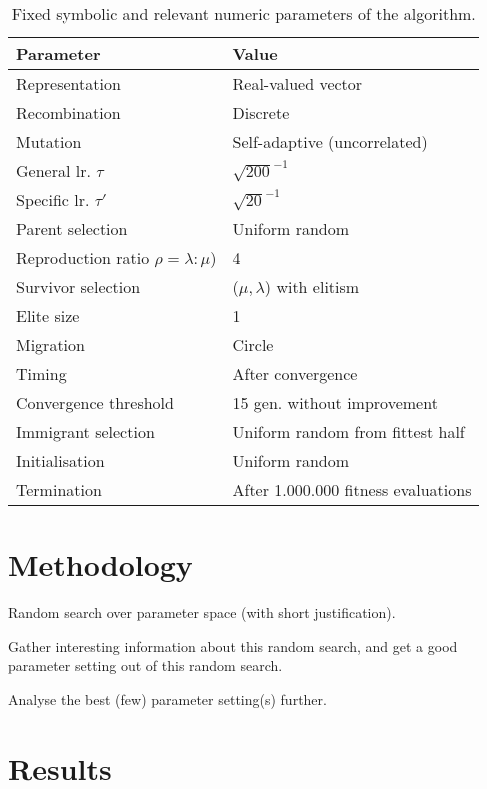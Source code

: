 \documentclass[letterpaper, 10 pt, conference]{ieeeconf}  %
\begin{document}
\begin{table}[h]
\caption{Fixed symbolic and relevant numeric parameters of the algorithm.}
\label{tab:params}
\centering
\begin{tabular}{>{\quad}ll}
\toprule
\textbf{Parameter} & \textbf{Value} \\
\midrule
Representation      & Real-valued vector \\
\midrule
Recombination       & Discrete \\
\midrule
Mutation            & Self-adaptive (uncorrelated) \\
\quad General lr. $\tau$ & $\sqrt{200}^{-1}$ \\
\quad Specific lr. $\tau'$ & $\sqrt{20}^{-1}$ \\
\midrule
Parent selection    & Uniform random \\
\quad Reproduction ratio $\rho=\lambda:\mu$) & 4 \\
\midrule
Survivor selection  & ($\mu,\lambda$) with elitism \\
\quad Elite size & 1 \\
\midrule
Migration           & Circle \\
\quad Timing        & After convergence \\
\quad Convergence threshold & 15 gen. without improvement \\
\quad Immigrant selection & Uniform random from fittest half \\
\midrule
Initialisation      & Uniform random \\
\midrule
Termination         & After 1.000.000 fitness evaluations \\
\bottomrule
\end{tabular}
\end{table}

\section{Methodology}

Random search over parameter space (with short justification).

Gather interesting information about this random search, and get a good parameter setting out of this random search.

Analyse the best (few) parameter setting(s) further.


\section{Results}
\end{document}
